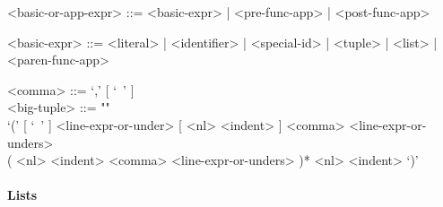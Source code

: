 \documentclass{article}
\begin{document}
\begin{itemize}
\begin{grammar}
<basic-or-app-expr> ::= <basic-expr> | <pre-func-app> | <post-func-app>

<basic-expr> ::=
<literal> | <identifier> | <special-id> | <tuple> | <list> | <paren-func-app>

<comma> ::= `,' [ `\ ' ]
\\

<big-tuple> ::= ""\\
`(' [ `\ ' ] <line-expr-or-under> [ <nl> <indent> ]
<comma> <line-expr-or-unders> \\
( <nl> <indent> <comma> <line-expr-or-unders> )* 
<nl> <indent> `)'
\end{grammar}

\end{itemize}

\paragraph{Lists}
\end{document}
